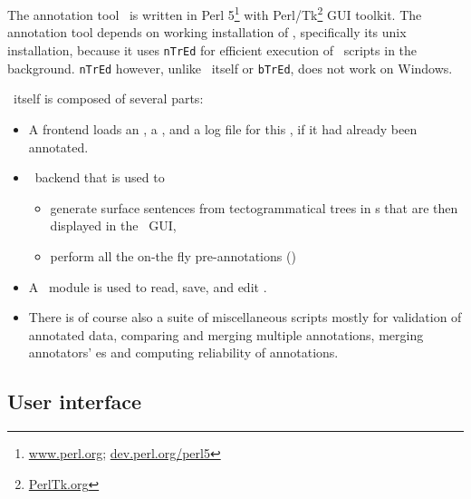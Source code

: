
\chapter{\seman}
\label{sec:seman}
The annotation tool \seman\ is written in Perl 5\footnote{\url{www.perl.org}; \url{dev.perl.org/perl5}} with Perl/Tk\footnote{\url{PerlTk.org}} GUI toolkit. The annotation tool depends on working installation of \tred, specifically its unix installation, because it uses \texttt{nTrEd} for efficient execution of \tred\ scripts in the background. \texttt{nTrEd} however, unlike \tred\ itself or \texttt{bTrEd}, does not work on Windows.%

 \seman\ itself is composed of several parts:
\begin{itemize}
  \item A frontend loads an \sf, a \semlex,  and a log file for this \sf, if it had already been annotated. 
  \item \ntred\ backend that is used to 
	\begin{itemize}
	  \item generate surface sentences from tectogrammatical trees in \tf{}s that are then displayed in the \seman\ GUI,
	  \item perform all the on-the fly pre-annotations ()
	\end{itemize}
  \item A \semlex\ module is used to read, save, and edit \semlex.
  \item There is of course also a suite of miscellaneous scripts mostly for validation of annotated data, comparing and merging multiple annotations, merging annotators' \semlex{}es and computing reliability of annotations.
\end{itemize}

\section{User interface}
\label{sec:seman:gui}